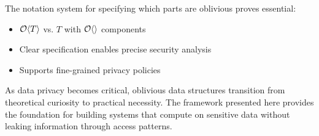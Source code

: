 \documentclass[11pt,final]{article}
\begin{document}
The notation system for specifying which parts are oblivious proves essential:
\begin{itemize}
    \item $\mathcal{O}\langle T \rangle$ vs. $T$ with $\mathcal{O}\langle  \rangle$ components
    \item Clear specification enables precise security analysis
    \item Supports fine-grained privacy policies
\end{itemize}

As data privacy becomes critical, oblivious data structures transition from theoretical curiosity to practical necessity. The framework presented here provides the foundation for building systems that compute on sensitive data without leaking information through access patterns.


\end{document}
